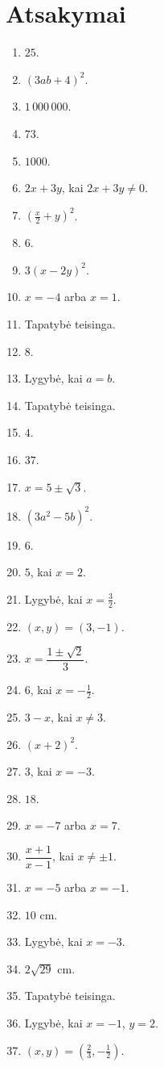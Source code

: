 \documentclass[11pt,a4paper]{article}
\begin{document}
\section*{Atsakymai}
\begin{enumerate}
\item \(25\).
\item \((3ab+4)^2\).
\item \(1\,000\,000\).
\item \(73\).
\item \(1000\).
\item \(2x+3y\), kai \(2x+3y\ne0\).
\item \((\frac x2+y)^2\).
\item \(6\).
\item \(3(x-2y)^2\).
\item \(x=-4\) arba \(x=1\).
\item Tapatybė teisinga.
\item \(8\).
\item Lygybė, kai \(a=b\).
\item Tapatybė teisinga.
\item \(4\).
\item \(37\).
\item \(x=5\pm\sqrt3\).
\item \((3a^2-5b)^2\).
\item \(6\).
\item \(5\), kai \(x=2\).
\item Lygybė, kai \(x=\frac32\).
\item \((x,y)=(3,-1)\).
\item \(x=\dfrac{1\pm\sqrt2}{3}\).
\item \(6\), kai \(x=-\frac12\).
\item \(3-x\), kai \(x\ne3\).
\item \((x+2)^2\).
\item \(3\), kai \(x=-3\).
\item \(18\).
\item \(x=-7\) arba \(x=7\).
\item \(\dfrac{x+1}{x-1}\), kai \(x\ne\pm1\).
\item \(x=-5\) arba \(x=-1\).
\item \(10\text{ cm}\).
\item Lygybė, kai \(x=-3\).
\item \(2\sqrt{29}\text{ cm}\).
\item Tapatybė teisinga.
\item Lygybė, kai \(x=-1\), \(y=2\).
\item \((x,y)=(\frac23,-\frac12)\).

\end{enumerate}
\end{document}
